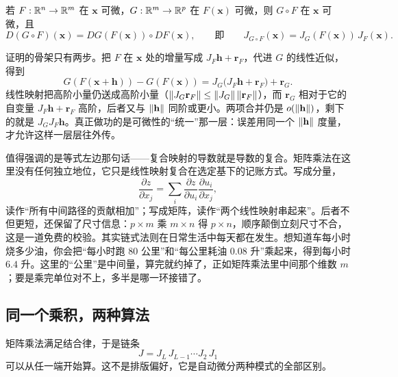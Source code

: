 \begin{theorem}
若 \(F:\mathbb{R}^n\to\mathbb{R}^m\) 在 \(\mathbf x\) 可微，\(G:\mathbb{R}^m\to\mathbb{R}^p\) 在 \(F(\mathbf x)\) 可微，则 \(G\circ F\) 在 \(\mathbf x\) 可微，且
\[
D(G\circ F)(\mathbf x)=DG(F(\mathbf x))\circ DF(\mathbf x),
\qquad\text{即}\qquad
J_{G\circ F}(\mathbf x)=J_G(F(\mathbf x))\,J_F(\mathbf x).
\]
\end{theorem}

证明的骨架只有两步。把 \(F\) 在 \(\mathbf x\) 处的增量写成 \(J_F\mathbf h+\mathbf r_F\)，代进 \(G\) 的线性近似，得到
\[
G(F(\mathbf x+\mathbf h))-G(F(\mathbf x))
=J_G\bigl(J_F\mathbf h+\mathbf r_F\bigr)+\mathbf r_G .
\]
线性映射把高阶小量仍送成高阶小量（\(\left\lVert J_G\mathbf r_F\right\rVert\le\left\lVert J_G\right\rVert\left\lVert\mathbf r_F\right\rVert\)），而 \(\mathbf r_G\) 相对于它的自变量 \(J_F\mathbf h+\mathbf r_F\) 高阶，后者又与 \(\left\lVert\mathbf h\right\rVert\) 同阶或更小。两项合并仍是 \(o(\left\lVert\mathbf h\right\rVert)\)，剩下的就是 \(J_GJ_F\mathbf h\)。真正做功的是可微性的``统一''那一层：误差用同一个 \(\left\lVert\mathbf h\right\rVert\) 度量，才允许这样一层层往外传。

值得强调的是等式左边那句话——复合映射的导数就是导数的复合。矩阵乘法在这里没有任何独立地位，它只是线性映射复合在选定基下的记账方式。写成分量，
\[
\frac{\partial z}{\partial x_j}=\sum_{i}\frac{\partial z}{\partial u_i}\frac{\partial u_i}{\partial x_j},
\]
读作``所有中间路径的贡献相加''；写成矩阵，读作``两个线性映射串起来''。后者不但更短，还保留了尺寸信息：\(p\times m\) 乘 \(m\times n\) 得 \(p\times n\)，顺序颠倒立刻尺寸不合，这是一道免费的校验。其实链式法则在日常生活中每天都在发生。想知道车每小时烧多少油，你会把``每小时跑 \(80\) 公里''和``每公里耗油 \(0.08\) 升''乘起来，得到每小时 \(6.4\) 升。这里的``公里''是中间量，算完就约掉了，正如矩阵乘法里中间那个维数 \(m\)；要是乘完单位对不上，多半是哪一环接错了。

\subsection{同一个乘积，两种算法}

矩阵乘法满足结合律，于是链条
\[
J=J_L\,J_{L-1}\cdots J_2\,J_1
\]
可以从任一端开始算。这不是排版偏好，它是自动微分两种模式的全部区别。

